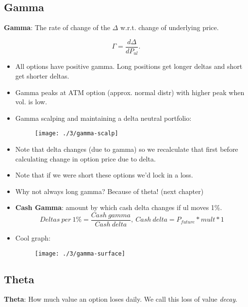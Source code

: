 \documentclass{article}
\begin{document}
\subsection{Gamma}
\textbf{Gamma}: The rate of change of the $\Delta$ w.r.t. change of underlying
price.

\begin{equation}
    \Gamma = \frac{d\Delta}{dP_{ul}}.
\end{equation}

\begin{itemize}
    \item All options have positive gamma. Long positions get longer deltas and
    short get shorter deltas.
    \item Gamma peaks at ATM option (approx. normal distr) with higher peak when
    vol. is low.
    \item Gamma scalping and maintaining a delta neutral portfolio:
    \begin{figure}[h]
        \texttt{[image: ./3/gamma-scalp]}
        \centering
    \end{figure}
    \item Note that delta changes (due to gamma) so we recalculate that first
    before calculating change in option price due to delta.
    \item Note that if we were short these options we'd lock in a loss.
    \item Why not always long gamma? Because of theta! (next chapter)
    \item \textbf{Cash Gamma}: amount by which cash delta changes if ul moves 1\%.
    \begin{equation*}
        Deltas \ per \ 1\% = \frac{Cash \ gamma}{Cash \ delta}, \ Cash \ delta = P_{future}*mult*1
    \end{equation*}
    \newpage
    \item Cool graph:

    \begin{figure}[h]
        \texttt{[image: ./3/gamma-surface]}
        \centering
    \end{figure}
\end{itemize}

\subsection{Theta}
\textbf{Theta}: How much value an option loses daily. We call this loss of value
\textit{decay}.
\end{document}
